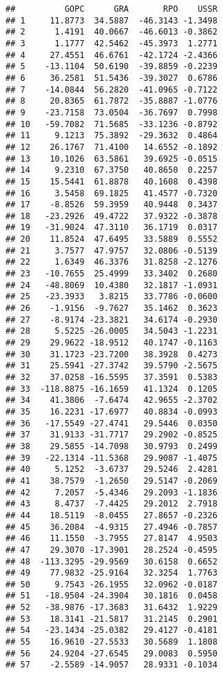\documentclass[
]{article}
\begin{document}
\begin{verbatim}
##          GOPC      GRA       RPO    USSR
## 1     11.8773  34.5887  -46.3143 -1.3498
## 2      1.4191  40.0667  -46.6013 -0.3862
## 3      1.1777  42.5462  -45.3973  1.2771
## 4     27.4551  46.6761  -42.1724 -2.4366
## 5    -13.1104  50.6190  -39.8859 -0.2239
## 6     36.2581  51.5436  -39.3027  0.6786
## 7    -14.0844  56.2820  -41.0965 -0.7122
## 8     20.8365  61.7872  -35.8887 -1.0776
## 9    -23.7158  73.0504  -36.7697  0.7998
## 10   -59.7082  71.5685  -33.1236 -0.8792
## 11     9.1213  75.3892  -29.3632  0.4864
## 12    26.1767  71.4100   14.6552 -0.1892
## 13    10.1026  63.5861   39.6925 -0.0515
## 14     9.2310  67.3750   40.8650  0.2257
## 15    15.5441  61.8878   40.1608  0.4398
## 16     3.5458  69.1825   41.4577 -0.7320
## 17    -8.8526  59.3959   40.9448  0.3437
## 18   -23.2926  49.4722   37.9322 -0.3878
## 19   -31.9024  47.3110   36.1719  0.0317
## 20    11.8524  47.6495   33.5889  0.5552
## 21     3.7577  47.9757   32.0806 -0.5139
## 22     1.6349  46.3376   31.8258 -2.1276
## 23   -10.7655  25.4999   33.3402  0.2680
## 24   -48.8069  10.4380   32.1817 -1.0931
## 25   -23.3933   3.8215   33.7786 -0.0600
## 26    -1.9156  -9.7627   35.1462  0.3623
## 27    -8.9174 -23.3821   34.6174 -0.2930
## 28     5.5225 -26.0005   34.5043 -1.2231
## 29    29.9622 -18.9512   40.1747 -0.1163
## 30    31.1723 -23.7200   38.3928  0.4273
## 31    25.5941 -27.3742   39.5790 -2.5675
## 32    37.0258 -16.5595   37.3591  0.5383
## 33  -118.8875 -16.1659   41.1324  0.1205
## 34    41.3806  -7.6474   42.9655 -2.3702
## 35    16.2231 -17.6977   40.8834 -0.0993
## 36   -17.5549 -27.4741   29.5446  0.0350
## 37    31.9133 -31.7717   29.2902 -0.8525
## 38    29.5855 -14.7098   30.9793  0.2499
## 39   -22.1314 -11.5368   29.9087 -1.4075
## 40     5.1252  -3.6737   29.5246  2.4281
## 41    38.7579  -1.2650   29.5147 -0.2069
## 42     7.2057  -5.4346   29.2093 -1.1836
## 43     8.4737  -7.4425   29.2012  2.7918
## 44    18.5119  -8.0455   27.8657 -0.2326
## 45    36.2084  -4.9315   27.4946 -0.7857
## 46    11.1550  -3.7955   27.8147  4.9503
## 47    29.3070 -17.3901   28.2524 -0.4595
## 48  -113.3295 -29.9569   30.6158  0.6652
## 49    77.9832 -25.9164   32.3254  1.7763
## 50     9.7543 -26.1955   32.0962 -0.0187
## 51   -18.9504 -24.3904   30.1816  0.0458
## 52   -38.9876 -17.3683   31.6432  1.9229
## 53    18.3141 -21.5817   31.2145  0.2901
## 54   -23.1434 -25.0382   29.4127 -0.4181
## 55    16.9610 -27.5533   30.5689  1.1808
## 56    24.9204 -27.6545   29.0083  0.5950
## 57    -2.5589 -14.9057   28.9331 -0.1034

\end{verbatim}
\end{document}
